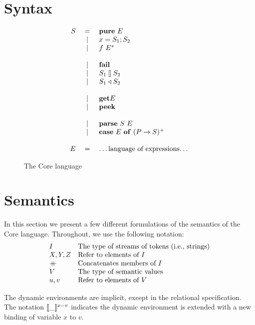 \documentclass{article}
\begin{document}
\section{Syntax}

\begin{figure}[H]
{\setlength{\arraycolsep}{0pt}
\[
\begin{array}{rcl}
S &{}={}& \mathbf{pure}~{E} \\
  &{}|{}& {x} = {S_1}; {S_2} \\
  &{}|{}& {f}~{E^*} \\
\\
  &{}|{}& \mathbf{fail} \\
  &{}|{}& {S_1} \talloblong {S_2} \\
  &{}|{}& {S_1} \triangleleft {S_2} \\
\\
  &{}|{}& \mathbf{get}{E} \\
  &{}|{}& \mathbf{peek} \\
\\
  &{}|{}& \mathbf{parse}~{S}~{E} \\
  &{}|{}& \mathbf{case}~{E}~\mathbf{of}~{(P \to S)^+} \\
\\
E &{}={}& \text{\dots language of expressions\dots} \\
\end{array}
\]
}
\caption{The Core language}
\end{figure}


\section{Semantics}

In this section we present a few different formulations of the semantics
of the Core language.  Throughout, we use the following notation:
\[
\begin{array}{ll}
I       & \text{The type of streams of tokens (i.e., strings)} \\
X,Y,Z   & \text{Refer to elements of $I$} \\
+\!\!\!+ & \text{Concatenates members of $I$} \\
V       & \text{The type of semantic values} \\
u,v     & \text{Refer to elements of $V$}
\end{array}
\]

The dynamic environments are implicit, except in the relational specification.
The notation $\llbracket{ \_ }\rrbracket^{x=v}$ indicates the dynamic environment is extended
with a new binding of variable $x$ to $v$.
\end{document}
